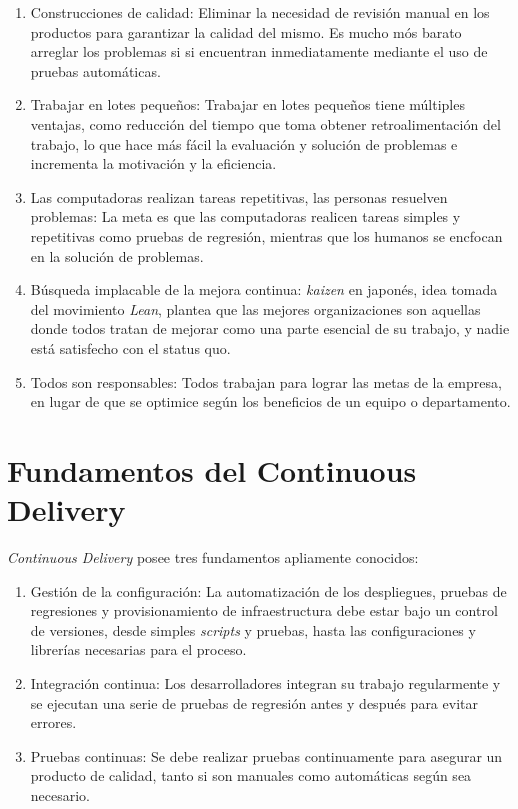 \begin{enumerate}
    \item Construcciones de calidad: Eliminar la necesidad de revisión manual en los productos para garantizar la calidad del mismo. Es mucho mós barato arreglar los problemas si si encuentran inmediatamente mediante el uso de pruebas automáticas.

    \item Trabajar en lotes pequeños: Trabajar en lotes pequeños tiene múltiples ventajas, como reducción del tiempo que toma obtener retroalimentación del trabajo, lo que hace más fácil la evaluación y solución de problemas e incrementa la motivación y la eficiencia.

    \item Las computadoras realizan tareas repetitivas, las personas resuelven problemas: La meta es que las computadoras realicen tareas simples y repetitivas como pruebas de regresión, mientras que los humanos se encfocan en la solución de problemas.

    \item Búsqueda implacable de la mejora continua: \textit{kaizen} en japonés, idea tomada del movimiento \textit{Lean}, plantea que las mejores organizaciones son aquellas donde todos tratan de mejorar como una parte esencial de su trabajo, y nadie está satisfecho con el status quo.

    \item Todos son responsables: Todos trabajan para lograr las metas de la empresa, en lugar de que se optimice según los beneficios de un equipo o departamento.

\end{enumerate}

\section{Fundamentos del Continuous Delivery}

\textit{Continuous Delivery} posee tres fundamentos apliamente conocidos:

\begin{enumerate}

    \item Gestión de la configuración: La automatización de los despliegues, pruebas de regresiones y provisionamiento de infraestructura debe estar bajo un control de versiones, desde simples \textit{scripts} y pruebas, hasta las configuraciones y librerías necesarias para el proceso.

    \item Integración continua: Los desarrolladores integran su trabajo regularmente y se ejecutan una serie de pruebas de regresión antes y después para evitar errores.

    \item Pruebas continuas: Se debe realizar pruebas continuamente para asegurar un producto de calidad, tanto si son manuales como automáticas según sea necesario.

\end{enumerate}

